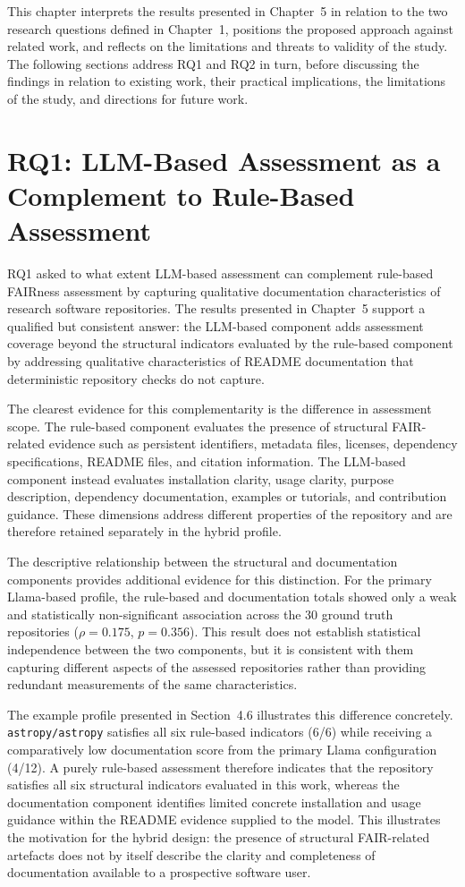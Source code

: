This chapter interprets the results presented in Chapter~5 in
relation to the two research questions defined in Chapter~1,
positions the proposed approach against related work, and reflects
on the limitations and threats to validity of the study. The
following sections address RQ1 and RQ2 in turn, before discussing
the findings in relation to existing work, their practical
implications, the limitations of the study, and directions for
future work.

\section{RQ1: LLM-Based Assessment as a Complement to Rule-Based Assessment}

RQ1 asked to what extent LLM-based assessment can complement
rule-based FAIRness assessment by capturing qualitative documentation
characteristics of research software repositories. The results
presented in Chapter~5 support a qualified but consistent answer:
the LLM-based component adds assessment coverage beyond the structural
indicators evaluated by the rule-based component by addressing
qualitative characteristics of README documentation that deterministic
repository checks do not capture.

The clearest evidence for this complementarity is the difference in
assessment scope. The rule-based component evaluates the presence of
structural FAIR-related evidence such as persistent identifiers,
metadata files, licenses, dependency specifications, README files,
and citation information. The LLM-based component instead evaluates
installation clarity, usage clarity, purpose description, dependency
documentation, examples or tutorials, and contribution guidance.
These dimensions address different properties of the repository and
are therefore retained separately in the hybrid profile.

The descriptive relationship between the structural and documentation
components provides additional evidence for this distinction. For the
primary Llama-based profile, the rule-based and documentation totals
showed only a weak and statistically non-significant association
across the 30 ground truth repositories
($\rho=0.175$, $p=0.356$). This result does not establish statistical
independence between the two components, but it is consistent with
them capturing different aspects of the assessed repositories rather
than providing redundant measurements of the same characteristics.

The example profile presented in Section~4.6 illustrates this
difference concretely. \texttt{astropy/astropy} satisfies all six
rule-based indicators (6/6) while receiving a comparatively low
documentation score from the primary Llama configuration (4/12).
A purely rule-based assessment therefore indicates that the repository
satisfies all six structural indicators evaluated in this work,
whereas the documentation component identifies limited concrete
installation and usage guidance within the README evidence supplied
to the model. This illustrates the motivation for the hybrid design:
the presence of structural FAIR-related artefacts does not by itself
describe the clarity and completeness of documentation available to
a prospective software user.

